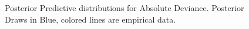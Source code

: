 \documentclass[
  letterpaper,
  DIV=11,
  numbers=noendperiod]{scrartcl}
\begin{document}
\begin{figure}[H]


\caption{\label{fig-post-pred-dist}Posterior Predictive distributions
for Absolute Deviance. Posterior Draws in Blue, colored lines are
empirical data.}

\end{figure}%
\end{document}
